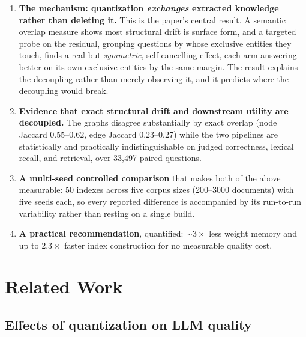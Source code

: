 \documentclass[conference, table]{IEEEtran}
\begin{document}
\begin{enumerate}
\item \textbf{The mechanism: quantization \emph{exchanges} extracted knowledge rather than deleting it.} This is the paper's central result. A semantic overlap measure shows most structural drift is surface form, and a targeted probe on the residual, grouping questions by whose exclusive entities they touch, finds a real but \emph{symmetric}, self-cancelling effect, each arm answering better on its own exclusive entities by the same margin. The result explains the decoupling rather than merely observing it, and it predicts where the decoupling would break.
\item \textbf{Evidence that exact structural drift and downstream utility are decoupled.} The graphs disagree substantially by exact overlap (node Jaccard $0.55$--$0.62$, edge Jaccard $0.23$--$0.27$) while the two pipelines are statistically and practically indistinguishable on judged correctness, lexical recall, and retrieval, over 33{,}497 paired questions.
\item \textbf{A multi-seed controlled comparison} that makes both of the above measurable: 50 indexes across five corpus sizes (200--3000 documents) with five seeds each, so every reported difference is accompanied by its run-to-run variability rather than resting on a single build.
\item \textbf{A practical recommendation}, quantified: $\sim\!3\times$ less weight memory and up to $2.3\times$ faster index construction for no measurable quality cost.
\end{enumerate}



\section{Related Work}\label{sec:related}

\subsection{Effects of quantization on LLM quality}
\end{document}
